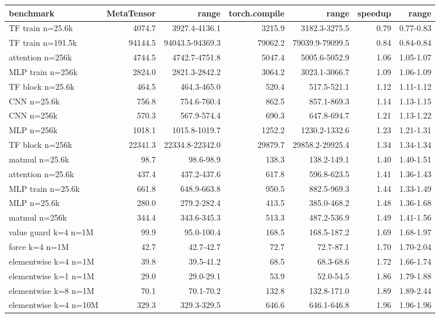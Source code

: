 \begin{tabular}{lrrrrrr}
\toprule
benchmark & MetaTensor & range & torch.compile & range & speedup & range \\
\midrule
TF train n=25.6k & 4074.7 & 3927.4-4136.1 & 3215.9 & 3182.3-3275.5 & 0.79 & 0.77-0.83 \\
TF train n=191.5k & 94144.5 & 94043.5-94369.3 & 79062.2 & 79039.9-79099.5 & 0.84 & 0.84-0.84 \\
attention n=256k & 4744.5 & 4742.7-4751.8 & 5047.4 & 5005.6-5052.9 & 1.06 & 1.05-1.07 \\
MLP train n=256k & 2824.0 & 2821.3-2842.2 & 3064.2 & 3023.1-3066.7 & 1.09 & 1.06-1.09 \\
TF block n=25.6k & 464.5 & 464.3-465.0 & 520.4 & 517.5-521.1 & 1.12 & 1.11-1.12 \\
CNN n=25.6k & 756.8 & 754.6-760.4 & 862.5 & 857.1-869.3 & 1.14 & 1.13-1.15 \\
CNN n=256k & 570.3 & 567.9-574.4 & 690.3 & 647.8-694.7 & 1.21 & 1.13-1.22 \\
MLP n=256k & 1018.1 & 1015.8-1019.7 & 1252.2 & 1230.2-1332.6 & 1.23 & 1.21-1.31 \\
TF block n=256k & 22341.3 & 22334.8-22342.0 & 29879.7 & 29858.2-29925.4 & 1.34 & 1.34-1.34 \\
matmul n=25.6k & 98.7 & 98.6-98.9 & 138.3 & 138.2-149.1 & 1.40 & 1.40-1.51 \\
attention n=25.6k & 437.4 & 437.2-437.6 & 617.8 & 596.8-623.5 & 1.41 & 1.36-1.43 \\
MLP train n=25.6k & 661.8 & 648.9-663.8 & 950.5 & 882.5-969.3 & 1.44 & 1.33-1.49 \\
MLP n=25.6k & 280.0 & 279.2-282.4 & 413.5 & 385.0-468.2 & 1.48 & 1.36-1.68 \\
matmul n=256k & 344.4 & 343.6-345.3 & 513.3 & 487.2-536.9 & 1.49 & 1.41-1.56 \\
value guard k=4 n=1M & 99.9 & 95.0-100.4 & 168.5 & 168.5-187.2 & 1.69 & 1.68-1.97 \\
force k=4 n=1M & 42.7 & 42.7-42.7 & 72.7 & 72.7-87.1 & 1.70 & 1.70-2.04 \\
elementwise k=4 n=1M & 39.8 & 39.5-41.2 & 68.5 & 68.3-68.6 & 1.72 & 1.66-1.74 \\
elementwise k=1 n=1M & 29.0 & 29.0-29.1 & 53.9 & 52.0-54.5 & 1.86 & 1.79-1.88 \\
elementwise k=8 n=1M & 70.1 & 70.1-70.2 & 132.8 & 132.8-171.0 & 1.89 & 1.89-2.44 \\
elementwise k=4 n=10M & 329.3 & 329.3-329.5 & 646.6 & 646.1-646.8 & 1.96 & 1.96-1.96 \\

\end{tabular}
